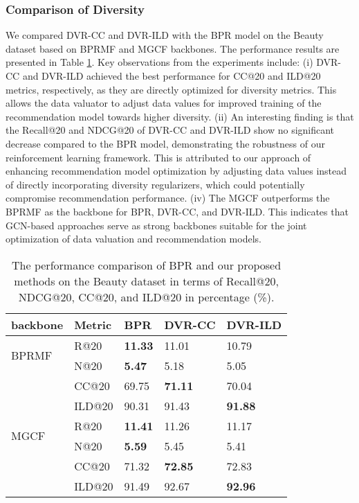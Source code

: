 \subsubsection{Comparison of Diversity}
We compared DVR-CC and DVR-ILD with the BPR model on the Beauty dataset based on BPRMF and MGCF backbones. The performance results are presented in Table \ref{tab:Diversity}. Key observations from the experiments include: (i) DVR-CC and DVR-ILD achieved the best performance for CC@20 and ILD@20 metrics, respectively, as they are directly optimized for diversity metrics. This allows the data valuator to adjust data values for improved training of the recommendation model towards higher diversity. (ii) An interesting finding is that the Recall@20 and NDCG@20 of DVR-CC and DVR-ILD show no significant decrease compared to the BPR model, demonstrating the robustness of our reinforcement learning framework. This is attributed to our approach of enhancing recommendation model optimization by adjusting data values instead of directly incorporating diversity regularizers, which could potentially compromise recommendation performance. (iv) The MGCF outperforms the BPRMF as the backbone for BPR, DVR-CC, and DVR-ILD. This indicates that GCN-based approaches serve as strong backbones suitable for the joint optimization of data valuation and recommendation models.

\begin{table}[t]
\centering
\small
\caption{The performance comparison of BPR and our proposed methods on the Beauty dataset in terms of Recall@20, NDCG@20, CC@20, and ILD@20 in percentage (\%).}
\label{tab:Diversity}
    \begin{tabular}{l|l|l|l|l}
    \hline
    backbone                  & Metric & BPR & DVR-CC & DVR-ILD \\ \hline
    \multirow{2}{*}{BPRMF}       & R@20  & \textbf{11.33}&  11.01&  10.79\\
                               & N@20 & \textbf{5.47}&   5.18&  5.05\\
                               & CC@20 &  69.75&   \textbf{71.11}&   70.04\\
                               & ILD@20 &  90.31&  91.43&  \textbf{91.88}\\ \cline{1-5} 
    \multirow{2}{*}{MGCF} & R@20  & \textbf{11.41}&  11.26&  11.17\\
                               & N@20 & \textbf{5.59}&  5.45&  5.41\\
                               & CC@20  & 71.32&   \textbf{72.85}&  72.83\\
                              & ILD@20 & 91.49&   92.67&  \textbf{92.96}\\ \hline
    \end{tabular}
\end{table}
    
